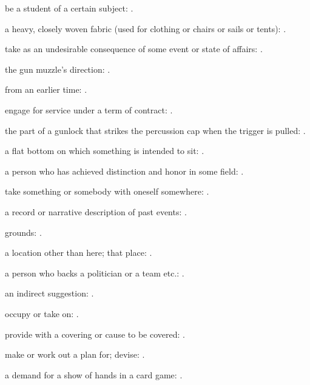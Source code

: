   be a student of a certain subject:   .

  a heavy, closely woven fabric (used for clothing or chairs or sails or tents):   .

  take as an undesirable consequence of some event or state of affairs:   .

  the gun muzzle's direction:   .

  from an earlier time: .

  engage for service under a term of contract:   .

  the part of a gunlock that strikes the percussion cap when the trigger is pulled:   .

  a flat bottom on which something is intended to sit: .

  a person who has achieved distinction and honor in some field: .

  take something or somebody with oneself somewhere:   .

  a record or narrative description of past events:   .

  grounds:   .

  a location other than here; that place: .

  a person who backs a politician or a team etc.:   .

  an indirect suggestion:   .

  occupy or take on:   .

  provide with a covering or cause to be covered: .

  make or work out a plan for; devise:   .

  a demand for a show of hands in a card game: .

